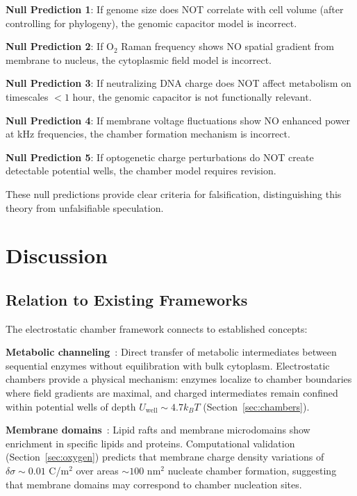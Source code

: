 \documentclass[twocolumn,10pt,aps,prd,superscriptaddress,floatfix,nofootinbib]{revtex4-2}
\theoremstyle{remark}
\begin{document}
\textbf{Null Prediction 1}: If genome size does NOT correlate with cell volume (after controlling for phylogeny), the genomic capacitor model is incorrect.

\textbf{Null Prediction 2}: If O$_2$ Raman frequency shows NO spatial gradient from membrane to nucleus, the cytoplasmic field model is incorrect.

\textbf{Null Prediction 3}: If neutralizing DNA charge does NOT affect metabolism on timescales $<1$ hour, the genomic capacitor is not functionally relevant.

\textbf{Null Prediction 4}: If membrane voltage fluctuations show NO enhanced power at kHz frequencies, the chamber formation mechanism is incorrect.

\textbf{Null Prediction 5}: If optogenetic charge perturbations do NOT create detectable potential wells, the chamber model requires revision.

These null predictions provide clear criteria for falsification, distinguishing this theory from unfalsifiable speculation.

\section{Discussion}
\label{sec:discussion}

\subsection{Relation to Existing Frameworks}

The electrostatic chamber framework connects to established concepts:

\textbf{Metabolic channeling}~\cite{Srere1987,Sweetlove2018}: Direct transfer of metabolic intermediates between sequential enzymes without equilibration with bulk cytoplasm. Electrostatic chambers provide a physical mechanism: enzymes localize to chamber boundaries where field gradients are maximal, and charged intermediates remain confined within potential wells of depth $U_{\mathrm{well}} \sim 4.7 k_B T$ (Section~\ref{sec:chambers}).

\textbf{Membrane domains}~\cite{Simons1997,Lingwood2010}: Lipid rafts and membrane microdomains show enrichment in specific lipids and proteins. Computational validation (Section~\ref{sec:oxygen}) predicts that membrane charge density variations of $\delta\sigma \sim 0.01$ C/m$^2$ over areas $\sim 100$ nm$^2$ nucleate chamber formation, suggesting that membrane domains may correspond to chamber nucleation sites.
\end{document}
